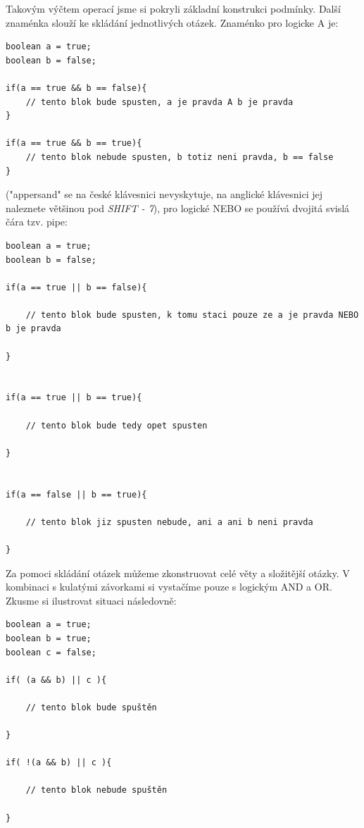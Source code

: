 \documentclass[10pt]{book}
\newcommand{\klavesy}[1]{\textsc{\em #1}}
\begin{document}
Takovým výčtem operací jsme si pokryli základní konstrukci podmínky. Další znaménka slouží ke skládání jednotlivých otázek. Znaménko pro logicke A je:

\begin{lstlisting}
boolean a = true;
boolean b = false;

if(a == true && b == false){
	// tento blok bude spusten, a je pravda A b je pravda
}

if(a == true && b == true){
	// tento blok nebude spusten, b totiz neni pravda, b == false
}

\end{lstlisting}


("appersand" se na české klávesnici nevyskytuje, na anglické klávesnici jej naleznete většinou pod \klavesy {SHIFT - 7}), pro logické NEBO se používá dvojitá svislá čára tzv. pipe:

\begin{lstlisting}
boolean a = true;
boolean b = false;

if(a == true || b == false){

	// tento blok bude spusten, k tomu staci pouze ze a je pravda NEBO b je pravda

}


if(a == true || b == true){

	// tento blok bude tedy opet spusten

}


if(a == false || b == true){

	// tento blok jiz spusten nebude, ani a ani b neni pravda 

}

\end{lstlisting}

Za pomoci skládání otázek můžeme zkonstruovat celé věty a složitější otázky. V kombinaci s kulatými závorkami si vystačíme pouze s logickým AND a OR. Zkusme si ilustrovat situaci následovně:


\begin{lstlisting}
boolean a = true;
boolean b = true;
boolean c = false;

if( (a && b) || c ){

	// tento blok bude spuštěn
	
}

if( !(a && b) || c ){

	// tento blok nebude spuštěn
	
}

\end{lstlisting}
\end{document}
